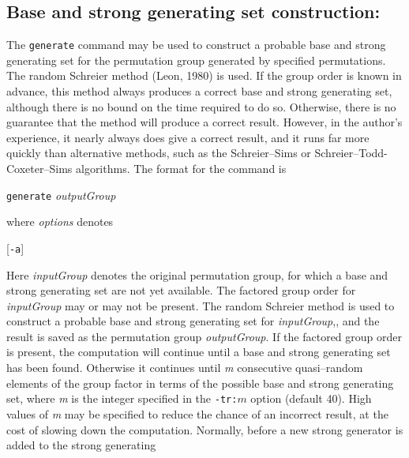 \subsection{Base and strong generating set construction:}The {\tt generate}
command may be used to construct a probable base and strong generating set
for the permutation group generated by specified permutations.  The random
Schreier method (Leon, 1980) is used.  If the group order is known in advance,
this method always produces a correct base and strong generating set, although
there is no bound on the time required to do so.  Otherwise,
there is no guarantee that the method will produce a correct result.  However,
in the author's experience, it nearly always does give a correct result, and
it runs far more quickly than alternative methods, such as the Schreier--Sims
or Schreier--Todd-Coxeter--Sims algorithms.
\medbreak
The format for the command is
%
\smallskip
\centerline{{\tt generate}\quad 
                         {\it outputGroup}}
%
\smallskip
where {\it options\/} denotes
\smallskip
\centerline{
            [{\tt -a}]\kern-1pt\enskip
            [{\tt -i}]\kern-1pt\enskip
            [{\tt -mb:}$k$]\kern-1pt\enskip
            [{\tt -mw:}$w$]\kern-1pt\enskip
            [{\tt -n:}{\it name\/}]\kern-1pt\enskip
            [{\tt -nro}]\kern-1pt\enskip
            [{\tt -p:}{\it path\/}]\kern-1pt\enskip
            [{\tt -q}]\kern-1pt\enskip
            [{\tt -s:}{\it seed\/}]\kern-1pt\enskip
            [{\tt -ti:}$i$]\kern-1pt\enskip
            [{\tt -tr:}$m$]\kern-1pt\enskip
            [{\tt -z}]}
\smallskip
Here {\it inputGroup\/} denotes the original permutation group, for which
a base and strong generating set are not yet available.
The factored group order for {\it inputGroup\/} may or may not be present.
The random Schreier method is used to construct a probable base and strong
generating set for {\it inputGroup},, and the result is saved as the 
permutation group {\it outputGroup}.
If the factored group order is present, the computation will continue until
a base and strong generating set has been found.  Otherwise it continues until
{\it m\/} consecutive quasi--random elements of the group factor in terms of the
possible base and strong generating set, where {\it m\/} is the integer
specified in the {\tt -tr:}$m$ option (default 40).  High values of 
{\it m} may be specified to reduce the chance of an incorrect result, at the
cost of slowing down the computation.
\medbreak
Normally, before a new strong generator is added to the strong generating
